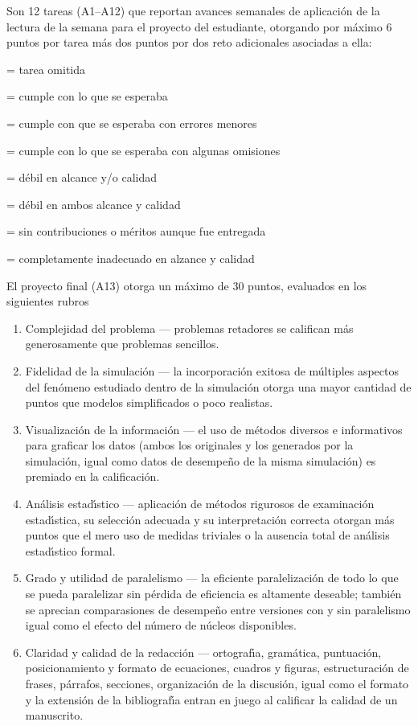 \documentclass[10 pt]{article}
\begin{document}
  Son 12 tareas (A1--A12) que reportan avances semanales de aplicaci\'{o}n
  de la lectura de la semana para el proyecto del estudiante,
  otorgando por m\'{a}ximo 6 puntos por tarea m\'{a}s dos puntos por dos
  reto adicionales asociadas a ella:
  \begin{description}[itemsep=0em]
  \item[NP]{= tarea omitida}
  \item[6]{= cumple con lo que se esperaba}
  \item[5]{= cumple con que se esperaba con errores menores}
  \item[4]{= cumple con lo que se esperaba con algunas omisiones}
  \item[3]{= d\'{e}bil en alcance y/o calidad}
  \item[2]{= d\'{e}bil en ambos alcance y calidad}
  \item[1]{= sin contribuciones o m\'{e}ritos aunque fue entregada}
  \item[0]{= completamente inadecuado en alzance y calidad}
  \end{description}
  El proyecto final (A13) otorga un m\'{a}ximo de 30 puntos, evaluados en los
  siguientes rubros
  \begin{enumerate}[itemsep=0em]

  \item{Complejidad del problema --- problemas retadores se califican
      m\'{a}s generosamente que problemas sencillos.}
   \item{Fidelidad de la
    simulaci\'{o}n --- la incorporaci\'{o}n exitosa de m\'{u}ltiples aspectos del
    fen\'{o}meno estudiado dentro de la simulaci\'{o}n otorga una mayor
    cantidad de puntos que modelos simplificados o poco realistas.}
  \item{Visualizaci\'{o}n de la informaci\'{o}n --- el uso de m\'{e}todos diversos e
    informativos para graficar los datos (ambos los originales y los
    generados por la simulaci\'{o}n, igual como datos de desempe\~{n}o de la
    misma simulaci\'{o}n) es premiado en la calificaci\'{o}n.}
  \item{An\'{a}lisis
    estad\'{\i}stico --- aplicaci\'{o}n de m\'{e}todos rigurosos de examinaci\'{o}n
    estad\'{\i}stica, su selecci\'{o}n adecuada y su interpretaci\'{o}n correcta
    otorgan m\'{a}s puntos que el mero uso de medidas triviales o la
    ausencia total de an\'{a}lisis estad\'{\i}stico formal.}
  \item{Grado y utilidad
    de paralelismo --- la eficiente paralelizaci\'{o}n de todo lo que se
    pueda paralelizar sin p\'{e}rdida de eficiencia es altamente deseable;
    tambi\'{e}n se aprecian comparasiones de desempe\~{n}o entre versiones con
    y sin paralelismo igual como el efecto del n\'{u}mero de n\'{u}cleos
    disponibles.}
  \item{Claridad y calidad de la redacci\'{o}n --- ortograf\'{\i}a,
    gram\'{a}tica, puntuaci\'{o}n, posicionamiento y formato de ecuaciones,
    cuadros y figuras, estructuraci\'{o}n de frases, p\'{a}rrafos, secciones,
    organizaci\'{o}n de la discusi\'{o}n, igual como el formato y la extensi\'{o}n
    de la bibliograf\'{\i}a entran en juego al calificar la calidad de un
    manuscrito.}
  \end{enumerate}
\end{document}
